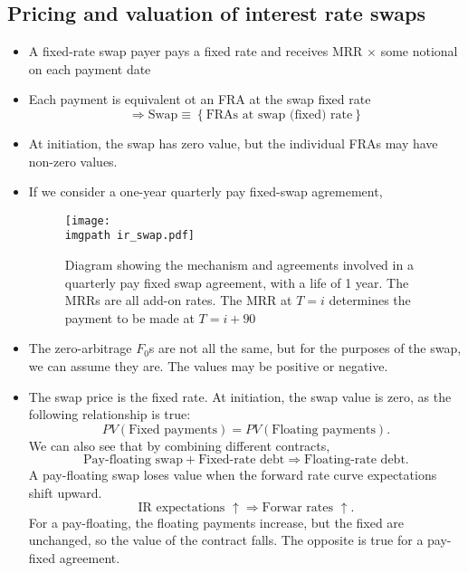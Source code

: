 \documentclass[../notes_compiled.tex]{subfiles}
\begin{document}
\subsection{Pricing and valuation of interest rate swaps}
\begin{itemize}
\item A fixed-rate swap payer pays a fixed rate and receives MRR $\times$ some notional on each payment date
\item Each payment is equivalent ot an FRA at the swap fixed rate
\begin{equation*}
\Rightarrow \text{Swap} \equiv \left\{\text{FRAs at swap (fixed) rate}\right\}
\end{equation*}
\item At initiation, the swap has zero value, but the individual FRAs may have non-zero values.
\item If we consider a one-year quarterly pay fixed-swap agremement, 
\begin{figure}[h]
  \centering
  \texttt{[image: \\imgpath ir\_swap.pdf]}
  \caption{Diagram showing the mechanism and agreements involved in a quarterly pay fixed swap agreement, with a life of 1 year. The MRRs are all add-on rates. The MRR at $T=i$ determines the payment to be made at $T=i+90$}
\end{figure}
\item[] The zero-arbitrage $F_{0}$s are not all the same, but for the purposes of the swap, we can assume they are. The values may be positive or negative.
\item The swap price is the fixed rate. At initiation, the swap value is zero, as the following relationship is true:
\begin{equation*}
PV(\text{Fixed payments}) = PV(\text{Floating payments}).
\end{equation*}
We can also see that by combining different contracts,
\begin{equation*}
\text{Pay-floating swap} + \text{Fixed-rate debt} \Rightarrow \text{Floating-rate debt}.
\end{equation*}
A pay-floating swap loses value when the forward rate curve expectations shift upward.
\begin{equation*}
\text{IR expectations } \uparrow \Rightarrow \text{Forwar rates } \uparrow.
\end{equation*}
For a pay-floating, the floating payments increase, but the fixed are unchanged, so the value of the contract falls. The opposite is true for a pay-fixed agreement.


\end{itemize}
\end{document}
